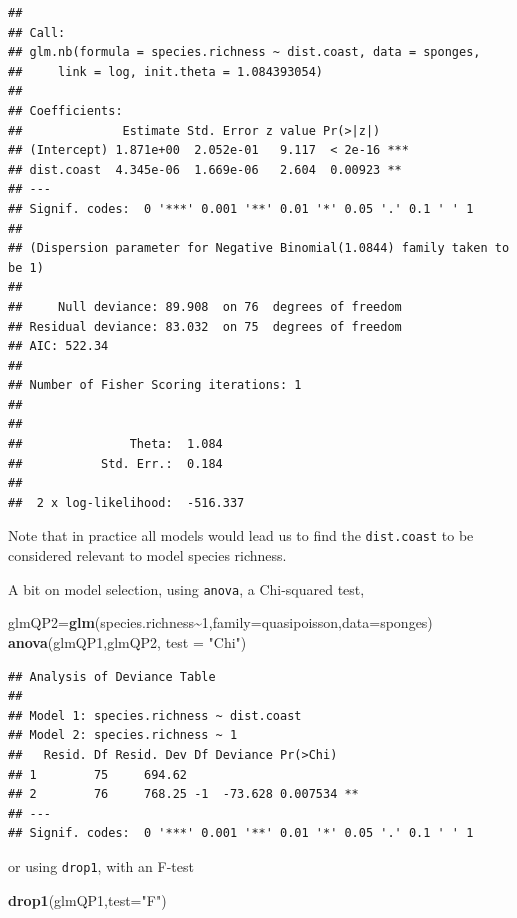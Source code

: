 \documentclass[
]{book}
\newenvironment{Shaded}{\begin{snugshade}}{\end{snugshade}}
\newcommand{\AttributeTok}[1]{\textcolor[rgb]{0.13,0.29,0.53}{#1}}
\newcommand{\DecValTok}[1]{\textcolor[rgb]{0.00,0.00,0.81}{#1}}
\newcommand{\FunctionTok}[1]{\textcolor[rgb]{0.13,0.29,0.53}{\textbf{#1}}}
\newcommand{\NormalTok}[1]{#1}
\newcommand{\OtherTok}[1]{\textcolor[rgb]{0.56,0.35,0.01}{#1}}
\newcommand{\SpecialCharTok}[1]{\textcolor[rgb]{0.81,0.36,0.00}{\textbf{#1}}}
\newcommand{\StringTok}[1]{\textcolor[rgb]{0.31,0.60,0.02}{#1}}
\begin{document}
\begin{verbatim}
## 
## Call:
## glm.nb(formula = species.richness ~ dist.coast, data = sponges, 
##     link = log, init.theta = 1.084393054)
## 
## Coefficients:
##              Estimate Std. Error z value Pr(>|z|)    
## (Intercept) 1.871e+00  2.052e-01   9.117  < 2e-16 ***
## dist.coast  4.345e-06  1.669e-06   2.604  0.00923 ** 
## ---
## Signif. codes:  0 '***' 0.001 '**' 0.01 '*' 0.05 '.' 0.1 ' ' 1
## 
## (Dispersion parameter for Negative Binomial(1.0844) family taken to be 1)
## 
##     Null deviance: 89.908  on 76  degrees of freedom
## Residual deviance: 83.032  on 75  degrees of freedom
## AIC: 522.34
## 
## Number of Fisher Scoring iterations: 1
## 
## 
##               Theta:  1.084 
##           Std. Err.:  0.184 
## 
##  2 x log-likelihood:  -516.337
\end{verbatim}

Note that in practice all models would lead us to find the \texttt{dist.coast} to be considered relevant to model species richness.

A bit on model selection, using \texttt{anova}, a Chi-squared test,

\begin{Shaded}
\begin{Highlighting}[]
\NormalTok{glmQP2}\OtherTok{=}\FunctionTok{glm}\NormalTok{(species.richness}\SpecialCharTok{\textasciitilde{}}\DecValTok{1}\NormalTok{,}\AttributeTok{family=}\NormalTok{quasipoisson,}\AttributeTok{data=}\NormalTok{sponges)}
\FunctionTok{anova}\NormalTok{(glmQP1,glmQP2, }\AttributeTok{test =} \StringTok{"Chi"}\NormalTok{)}
\end{Highlighting}
\end{Shaded}

\begin{verbatim}
## Analysis of Deviance Table
## 
## Model 1: species.richness ~ dist.coast
## Model 2: species.richness ~ 1
##   Resid. Df Resid. Dev Df Deviance Pr(>Chi)   
## 1        75     694.62                        
## 2        76     768.25 -1  -73.628 0.007534 **
## ---
## Signif. codes:  0 '***' 0.001 '**' 0.01 '*' 0.05 '.' 0.1 ' ' 1
\end{verbatim}

or using \texttt{drop1}, with an F-test

\begin{Shaded}
\begin{Highlighting}[]
\FunctionTok{drop1}\NormalTok{(glmQP1,}\AttributeTok{test=}\StringTok{"F"}\NormalTok{)}
\end{Highlighting}
\end{Shaded}
\end{document}
